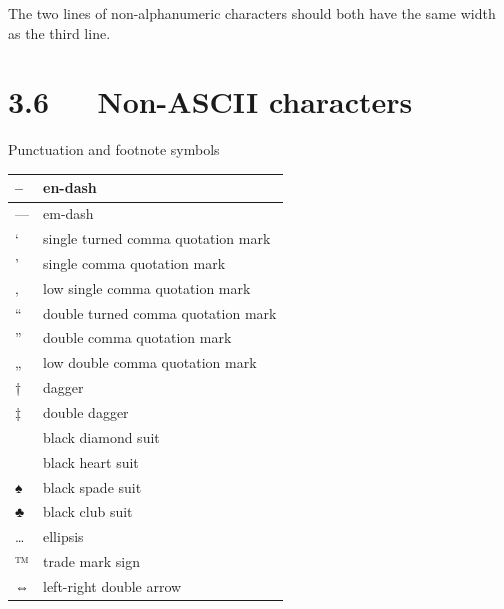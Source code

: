 \documentclass[a4paper]{memoir}
\newlength{\DUtablewidth} %
\begin{document}
The two lines of non-alphanumeric characters should both have the same
width as the third line.


\section{3.6   Non-ASCII characters%
  \label{non-ascii-characters}%
}

Punctuation and footnote symbols

\setlength{\DUtablewidth}{\linewidth}%
\begin{longtable*}{|p{0.028\DUtablewidth}|p{0.424\DUtablewidth}|}
\hline

–
 & 
en-dash
 \\
\hline

—
 & 
em-dash
 \\
\hline

‘
 & 
single turned comma quotation mark
 \\
\hline

’
 & 
single comma quotation mark
 \\
\hline

‚
 & 
low single comma quotation mark
 \\
\hline

“
 & 
double turned comma quotation mark
 \\
\hline

”
 & 
double comma quotation mark
 \\
\hline

„
 & 
low double comma quotation mark
 \\
\hline

†
 & 
dagger
 \\
\hline

‡
 & 
double dagger
 \\
\hline

 & 
black diamond suit
 \\
\hline

 & 
black heart suit
 \\
\hline

♠
 & 
black spade suit
 \\
\hline

♣
 & 
black club suit
 \\
\hline

…
 & 
ellipsis
 \\
\hline

™
 & 
trade mark sign
 \\
\hline

⇔
 & 
left-right double arrow
 \\
\hline
\end{longtable*}
\end{document}
